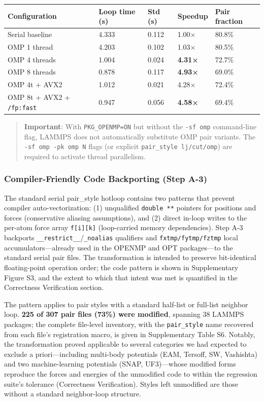 \documentclass[
  11pt,
]{article}
\newcounter{none} %
\begin{document}
{\def\LTcaptype{none} %
\begin{longtable}[]{@{}lllll@{}}
\toprule\noalign{}
Configuration & Loop time (s) & Std (s) & Speedup & Pair fraction \\
\midrule\noalign{}
\endhead
\bottomrule\noalign{}
\endlastfoot
Serial baseline & 4.333 & 0.112 & 1.00× & 80.8\% \\
OMP 1 thread & 4.203 & 0.102 & 1.03× & 80.5\% \\
OMP 4 threads & 1.004 & 0.024 & \textbf{4.31×} & 72.7\% \\
OMP 8 threads & 0.878 & 0.117 & \textbf{4.93×} & 69.0\% \\
OMP 4t + AVX2 & 1.012 & 0.021 & 4.28× & 72.4\% \\
OMP 8t + AVX2 + \texttt{/fp:fast} & 0.947 & 0.056 & \textbf{4.58×} &
69.4\% \\
\end{longtable}
}

\begin{quote}
\textbf{Important}: With \texttt{PKG\_OPENMP=ON} but without the
\texttt{-sf\ omp} command-line flag, LAMMPS does not automatically
substitute OMP pair variants. The \texttt{-sf\ omp\ -pk\ omp\ N} flags
(or explicit \texttt{pair\_style\ lj/cut/omp}) are required to activate
thread parallelism.
\end{quote}

\subsubsection{Compiler-Friendly Code Backporting (Step
A-3)}\label{compiler-friendly-code-backporting-step-a-3}

The standard serial pair\_style hotloop contains two patterns that
prevent compiler auto-vectorization: (1) unqualified \texttt{double\ **}
pointers for positions and forces (conservative aliasing assumptions),
and (2) direct in-loop writes to the per-atom force array
\texttt{f{[}i{]}{[}k{]}} (loop-carried memory dependencies). Step A-3
backports \texttt{\_\_restrict\_\_}/\texttt{\_noalias} qualifiers and
\texttt{fxtmp/fytmp/fztmp} local accumulators---already used in the
OPENMP and OPT packages---to the standard serial pair files. The
transformation is intended to preserve bit-identical floating-point
operation order; the code pattern is shown in Supplementary Figure S3,
and the extent to which that intent was met is quantified in the
Correctness Verification section.

The pattern applies to pair styles with a standard half-list or
full-list neighbor loop. \textbf{225 of 307 pair files (73\%) were
modified}, spanning 38 LAMMPS packages; the complete file-level
inventory, with the \texttt{pair\_style} name recovered from each file's
registration macro, is given in Supplementary Table S6. Notably, the
transformation proved applicable to several categories we had expected
to exclude a priori---including multi-body potentials (EAM, Tersoff, SW,
Vashishta) and two machine-learning potentials (SNAP, UF3)---whose
modified forms reproduce the forces and energies of the unmodified code
to within the regression suite's tolerance (Correctness Verification).
Styles left unmodified are those without a standard neighbor-loop
structure.
\end{document}
